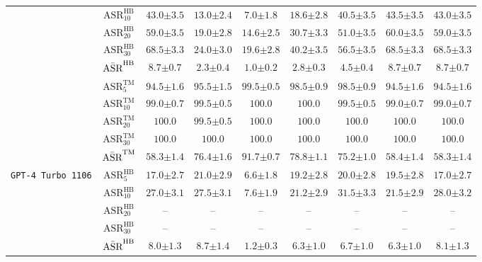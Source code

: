 \begin{table}[H]
{\begin{tabular}{c|c||c|c|c|c||c|c|c}
& $\text{ASR}^{\text{HB}}_{10}$ & $43.0{\pm 3.5}$ & $13.0{\pm 2.4}$ & $7.0{\pm 1.8}$ & $18.6{\pm 2.8}$ & $40.5{\pm 3.5}$ & $\mathbf{43.5{\pm 3.5}}$ & $43.0{\pm 3.5}$ \\
& $\text{ASR}^{\text{HB}}_{20}$ & $59.0{\pm 3.5}$ & $19.0{\pm 2.8}$ & $14.6{\pm 2.5}$ & $30.7{\pm 3.3}$ & $51.0{\pm 3.5}$ & $\mathbf{60.0{\pm 3.5}}$ & $59.0{\pm 3.5}$ \\
& $\text{ASR}^{\text{HB}}_{30}$ & $\mathbf{68.5{\pm 3.3}}$ & $24.0{\pm 3.0}$ & $19.6{\pm 2.8}$ & $40.2{\pm 3.5}$ & $56.5{\pm 3.5}$ & $\mathbf{68.5{\pm 3.3}}$ & $\mathbf{68.5{\pm 3.3}}$ \\
& $\Bar{\text{ASR}}^{\text{HB}}$ & $8.7{\pm 0.7}$ & $2.3{\pm 0.4}$ & $1.0{\pm 0.2}$ & $2.8{\pm 0.3}$ & $4.5{\pm 0.4}$ & $8.7{\pm 0.7}$ & $\mathbf{8.7{\pm 0.7}}$ \\
\cline{2-9}
& $\text{ASR}^{\text{TM}}_{5}$ & $94.5{\pm 1.6}$ & $95.5{\pm 1.5}$ & $\mathbf{99.5{\pm 0.5}}$ & $98.5{\pm 0.9}$ & $98.5{\pm 0.9}$ & $94.5{\pm 1.6}$ & $94.5{\pm 1.6}$ \\
& $\text{ASR}^{\text{TM}}_{10}$ & $99.0{\pm 0.7}$ & $99.5{\pm 0.5}$ & $\mathbf{100.0}$ & $\mathbf{100.0}$ & $99.5{\pm 0.5}$ & $99.0{\pm 0.7}$ & $99.0{\pm 0.7}$ \\
& $\text{ASR}^{\text{TM}}_{20}$ & $\mathbf{100.0}$ & $99.5{\pm 0.5}$ & $\mathbf{100.0}$ & $\mathbf{100.0}$ & $\mathbf{100.0}$ & $\mathbf{100.0}$ & $\mathbf{100.0}$ \\
& $\text{ASR}^{\text{TM}}_{30}$ & $\mathbf{100.0}$ & $\mathbf{100.0}$ & $\mathbf{100.0}$ & $\mathbf{100.0}$ & $\mathbf{100.0}$ & $\mathbf{100.0}$ & $\mathbf{100.0}$ \\
& $\Bar{\text{ASR}}^{\text{TM}}$ & $58.3{\pm 1.4}$ & $76.4{\pm 1.6}$ & $\mathbf{91.7{\pm 0.7}}$ & $78.8{\pm 1.1}$ & $75.2{\pm 1.0}$ & $58.4{\pm 1.4}$ & $58.3{\pm 1.4}$ \\
\hline
\hline
\multirow{11}{*}{\texttt{GPT-4 Turbo 1106}} 
& $\text{ASR}^{\text{HB}}_{5}$ & $17.0{\pm 2.7}$ & $\mathbf{21.0{\pm 2.9}}$ & $6.6{\pm 1.8}$ & $19.2{\pm 2.8}$ & $20.0{\pm 2.8}$ & $19.5{\pm 2.8}$ & $17.0{\pm 2.7}$ \\
& $\text{ASR}^{\text{HB}}_{10}$ & $27.0{\pm 3.1}$ & $27.5{\pm 3.1}$ & $7.6{\pm 1.9}$ & $21.2{\pm 2.9}$ & $\mathbf{31.5{\pm 3.3}}$ & $21.5{\pm 2.9}$ & $28.0{\pm 3.2}$ \\
& $\text{ASR}^{\text{HB}}_{20}$ & -- & -- & -- & -- & -- & -- & -- \\
& $\text{ASR}^{\text{HB}}_{30}$ & -- & -- & -- & -- & -- & -- & -- \\
& $\Bar{\text{ASR}}^{\text{HB}}$ & $8.0{\pm 1.3}$ & $\mathbf{8.7{\pm 1.4}}$ & $1.2{\pm 0.3}$ & $6.3{\pm 1.0}$ & $6.7{\pm 1.0}$ & $6.3{\pm 1.0}$ & $8.1{\pm 1.3}$ \\

\end{tabular}}
\end{table}
